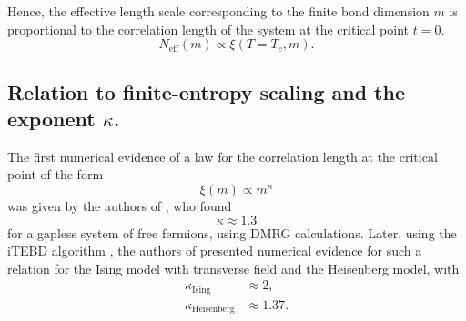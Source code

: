 Hence, the effective length scale corresponding to the finite bond dimension $m$ is
proportional to the correlation length of the system at the critical point $t = 0$.
\begin{equation}
  N_{\text{eff}}(m) \propto \xi(T = T_c, m).
\end{equation}


\subsection{Relation to finite-entropy scaling and the exponent $\kappa$.}

%
%
%


The first numerical evidence of a law for the correlation length at the critical point of the form
\begin{equation}\label{eq:xi_propto_m_kappa}
  \xi(m) \propto m^{\kappa}
\end{equation}
was given by the authors of \cite{andersson1999density}, who found
\begin{equation}
  \kappa \approx 1.3
\end{equation}
for a gapless system of free fermions, using DMRG calculations. Later, using the iTEBD algorithm
\cite{vidal2007classical}, the authors of \cite{tagliacozzo2008scaling} presented numerical evidence for such a relation
for the Ising model with transverse field and the Heisenberg model, with
\begin{align}
  \kappa_{\text{Ising}} & \approx 2, \\
  \kappa_{\text{Heisenberg}} & \approx 1.37.
\end{align}

